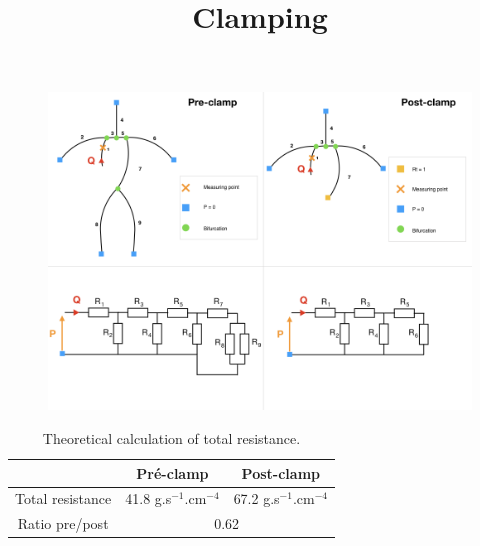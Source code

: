 \documentclass{config}
\title{Clamping}
\begin{document}
\maketitle

\begin{figure}[H]
\begin{center}
\includegraphics[scale=0.48]{Clamping.png}
\caption{}
\label{schema}
\end{center}
\end{figure}

\begin{table}[H]
\begin{center}
\begin{tabular}{|c|c|c|}
\hline
 & Pré-clamp & Post-clamp \\ 
\hline 
Total resistance & 41.8 g.s$^{-1}$.cm$^{-4}$ & 67.2 g.s$^{-1}$.cm$^{-4}$ \\
\hline
\hline 
Ratio pre/post & \multicolumn{2}{|c|}{0.62}\\
\hline
\end{tabular} 
\caption{Theoretical calculation of total resistance.}
\label{res_pré}
\end{center}
\end{table}
\end{document}
